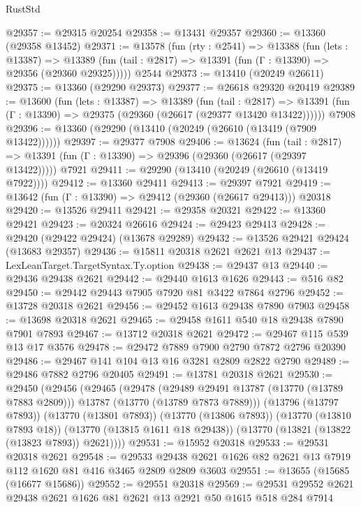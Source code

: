 \begin{lexlean}{RustStd}
\begin{coremodule}
@29357 := @29315 @20254
@29358 := @13431 @29357
@29360 := @13360 (@29358 @13452)
@29371 := @13578
    (fun (rty : @2541) =>
    @13388
      (fun (lets : @13387) =>
      @13389 (fun (tail : @2817) => @13391 (fun (Γ : @13390) => @29356 (@29360 @29325)))))
    @2544
@29373 := @13410 (@20249 @26611)
@29375 := @13360 (@29290 @29373)
@29377 := @26618 @29320 @20419
@29389 := @13600
    (fun (lets : @13387) =>
    @13389
      (fun (tail : @2817) =>
      @13391 (fun (Γ : @13390) => @29375 (@29360 (@26617 (@29377 @13420 @13422))))))
    @7908
@29396 := @13360 (@29290 (@13410 (@20249 (@26610 (@13419 (@7909 @13422))))))
@29397 := @29377 @7908
@29406 := @13624
    (fun (tail : @2817) => @13391 (fun (Γ : @13390) => @29396 (@29360 (@26617 (@29397 @13422)))))
    @7921
@29411 := @29290 (@13410 (@20249 (@26610 (@13419 @7922))))
@29412 := @13360 @29411
@29413 := @29397 @7921
@29419 := @13642 (fun (Γ : @13390) => @29412 (@29360 (@26617 @29413))) @20318
@29420 := @13526 @29411
@29421 := @29358 @20321
@29422 := @13360 @29421
@29423 := @20324 @26616
@29424 := @29423 @29413
@29428 := @29420 (@29422 @29424) (@13678 @29289)
@29432 := @13526 @29421 @29424 (@13683 @29357)
@29436 := @15811 @20318 @2621 @2621 @13
@29437 := LexLeanTarget.TargetSyntax.Ty.option
@29438 := @29437 @13
@29440 := @29436 @29438 @2621
@29442 := @29440 @1613 @1626
@29443 := @516 @82
@29450 := @29442 @29443 @7905 @7920 @81 @3422 @7864 @2796
@29452 := @13728 @20318 @2621
@29456 := @29452 @1613 @29438 @7890 @7903
@29458 := @13698 @20318 @2621
@29465 := @29458 @1611 @540 @18 @29438 @7890 @7901 @7893
@29467 := @13712 @20318 @2621
@29472 := @29467 @115 @539 @13 @17 @3576
@29478 := @29472 @7889 @7900 @2790 @7872 @2796 @20390
@29486 := @29467 @141 @104 @13 @16 @3281 @2809 @2822 @2790
@29489 := @29486 @7882 @2796 @20405
@29491 := @13781 @20318 @2621
@29530 := @29450
    (@29456
      (@29465
        (@29478
          (@29489 @29491 @13787 (@13770 (@13789 @7883 @2809)))
          @13787
          (@13770 (@13789 @7873 @7889)))
        (@13796 (@13797 @7893))
        (@13770 (@13801 @7893))
        (@13770 (@13806 @7893))
        (@13770 (@13810 @7893 @18))
        (@13770 (@13815 @1611 @18 @29438))
        (@13770 (@13821 (@13822 (@13823 @7893)) @2621))))
@29531 := @15952 @20318
@29533 := @29531 @20318 @2621
@29548 := @29533 @29438 @2621 @1626 @82 @2621 @13 @7919 @112 @1620 @81 @416 @3465 @2809 @2809 @3603
@29551 := @13655 (@15685 (@16677 @15686))
@29552 := @29551 @20318
@29569 := @29531
    @29552
    @2621
    @29438
    @2621
    @1626
    @81
    @2621
    @13
    @2921
    @50
    @1615
    @518
    @284
    @7914

\end{coremodule}
\end{lexlean}
